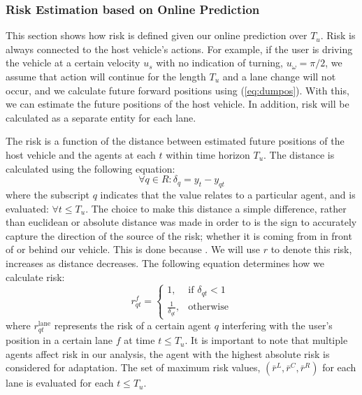 \documentclass[conference]{IEEEtran}
\begin{document}
\subsubsection{Risk Estimation based on Online Prediction}
This section shows how risk is defined given our online prediction over $T_{u}$. Risk is always connected to the host vehicle's actions. For example, if the user is driving the vehicle at a certain velocity $u_s$ with no indication of turning, $u_\omega = \pi/2$, we assume that action will continue for the length $T_{u}$ and a lane change will not occur, and we calculate future forward positions using (\ref{eq:dumpos}). With this, we can estimate the future positions of the host vehicle. In addition, risk will be calculated as a separate entity for each lane.

The risk is a function of the distance between estimated future positions of the host vehicle and the agents at each $t$ within time horizon $T_{u}$. The distance is calculated using the following equation:
\begin{equation}
    \forall q \in R : \delta_q = y_t - y_{qt}
\end{equation}
where the subscript $q$ indicates that the value relates to a particular agent, and is evaluated: $ \forall t \leq T_u$. The choice to make this distance a simple difference, rather than euclidean or absolute distance was made in order to is the sign to accurately capture the direction of the source of the risk; whether it is coming from in front of or behind our vehicle. This is done because . We will use $r$ to denote this risk, increases as distance decreases. The following equation determines how we calculate risk:
\begin{equation}
    r_{qt}^{f} =
    \begin{cases}
    1,                      & \text{if } \delta_{qt} < 1 \\
    \frac{1}{\delta_{qt}},  & \text{otherwise} 
    \end{cases}
\end{equation}
where $r_{qt}^{\text{lane}}$ represents the risk of a certain agent $q$ interfering with the user's position in a certain lane $f$ at time $t \leq T_u$. It is important to note that multiple agents affect risk in our analysis, the agent with the highest absolute risk is considered for adaptation. The set of maximum risk values, $(\bar{r}^{L},\bar{r}^{C},\bar{r}^{R})$ for each lane is evaluated for each $t \leq T_u$.
\end{document}
